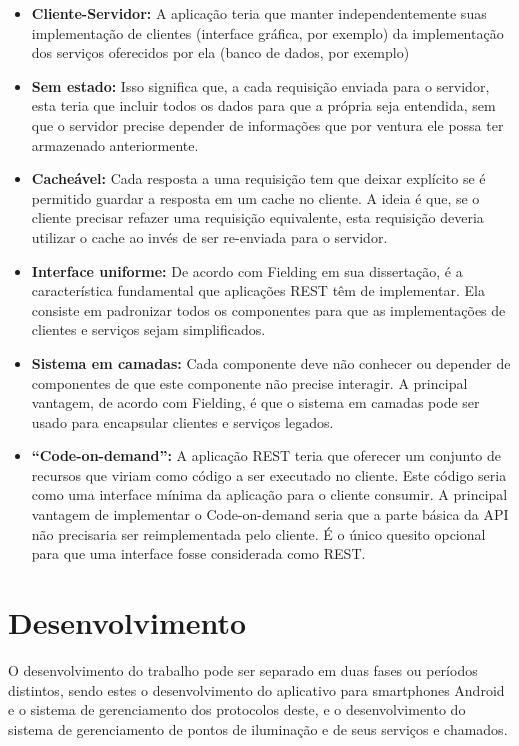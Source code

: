 \documentclass[
	article,			%
	11pt,				%
	oneside,			%
	a4paper,			%
	english,			%
	brazil,				%
	sumario=tradicional
	]{abntex2}
\begin{document}
\begin{itemize}
\item \textbf{Cliente-Servidor:} A aplicação teria que manter independentemente suas implementação de clientes (interface gráfica, por exemplo) da implementação dos serviços oferecidos por ela (banco de dados, por exemplo)

\item \textbf{Sem estado:} Isso significa que, a cada requisição enviada para o servidor, esta teria que incluir todos os dados para que a própria seja entendida, sem que o servidor precise depender de informações que por ventura ele possa ter armazenado anteriormente.

\item \textbf{Cacheável:} Cada resposta a uma requisição tem que deixar explícito se é permitido guardar a resposta em um cache no cliente.
A ideia é que, se o cliente precisar refazer uma requisição equivalente, esta requisição deveria utilizar o cache ao invés de ser re-enviada para o servidor.

\item \textbf{Interface uniforme:} De acordo com Fielding em sua dissertação, é a característica fundamental que aplicações REST têm de implementar.
Ela consiste em padronizar todos os componentes para que as implementações de clientes e serviços sejam simplificados.

\item \textbf{Sistema em camadas:} Cada componente deve não conhecer ou depender de componentes de que este componente não precise interagir.
A principal vantagem, de acordo com Fielding, é que o sistema em camadas pode ser usado para encapsular clientes e serviços legados.

\item \textbf{“Code-on-demand”:} A aplicação REST teria que oferecer um conjunto de recursos que viriam como código a ser executado no cliente.
Este código seria como uma interface mínima da aplicação para o cliente consumir.
A principal vantagem de implementar o Code-on-demand seria que a parte básica da API não precisaria ser reimplementada pelo cliente.
É o único quesito opcional para que uma interface fosse considerada como REST.
\end{itemize}

\section{Desenvolvimento}

O desenvolvimento do trabalho pode ser separado em duas fases ou períodos distintos, sendo estes o desenvolvimento do aplicativo para smartphones Android e o sistema de gerenciamento dos protocolos deste, e o desenvolvimento do sistema de gerenciamento de pontos de iluminação e de seus serviços e chamados.
\end{document}
